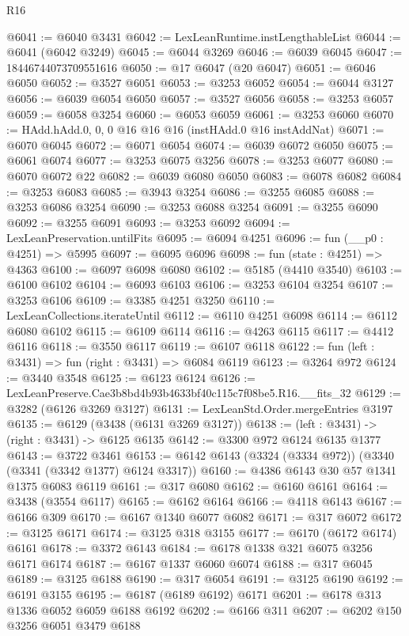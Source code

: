 \begin{lexlean}{R16}
\begin{coremodule}
@6041 := @6040 @3431
@6042 := LexLeanRuntime.instLengthableList
@6044 := @6041 (@6042 @3249)
@6045 := @6044 @3269
@6046 := @6039 @6045
@6047 := 18446744073709551616
@6050 := @17 @6047 (@20 @6047)
@6051 := @6046 @6050
@6052 := @3527 @6051
@6053 := @3253 @6052
@6054 := @6044 @3127
@6056 := @6039 @6054 @6050
@6057 := @3527 @6056
@6058 := @3253 @6057
@6059 := @6058 @3254
@6060 := @6053 @6059
@6061 := @3253 @6060
@6070 := HAdd.hAdd.{0, 0, 0} @16 @16 @16 (instHAdd.{0} @16 instAddNat)
@6071 := @6070 @6045
@6072 := @6071 @6054
@6074 := @6039 @6072 @6050
@6075 := @6061 @6074
@6077 := @3253 @6075 @3256
@6078 := @3253 @6077
@6080 := @6070 @6072 @22
@6082 := @6039 @6080 @6050
@6083 := @6078 @6082
@6084 := @3253 @6083
@6085 := @3943 @3254
@6086 := @3255 @6085
@6088 := @3253 @6086 @3254
@6090 := @3253 @6088 @3254
@6091 := @3255 @6090
@6092 := @3255 @6091
@6093 := @3253 @6092
@6094 := LexLeanPreservation.untilFits
@6095 := @6094 @4251
@6096 := fun (__p0 : @4251) => @5995
@6097 := @6095 @6096
@6098 := fun (state : @4251) => @4363
@6100 := @6097 @6098 @6080
@6102 := @5185 (@4410 @3540)
@6103 := @6100 @6102
@6104 := @6093 @6103
@6106 := @3253 @6104 @3254
@6107 := @3253 @6106
@6109 := @3385 @4251 @3250
@6110 := LexLeanCollections.iterateUntil
@6112 := @6110 @4251 @6098
@6114 := @6112 @6080 @6102
@6115 := @6109 @6114
@6116 := @4263 @6115
@6117 := @4412 @6116
@6118 := @3550 @6117
@6119 := @6107 @6118
@6122 := fun (left : @3431) => fun (right : @3431) => @6084 @6119
@6123 := @3264 @972
@6124 := @3440 @3548
@6125 := @6123 @6124
@6126 := LexLeanPreserve.Cae3b8bd4b93b4633bf40c115c7f08be5.R16.__fits_32
@6129 := @3282 (@6126 @3269 @3127)
@6131 := LexLeanStd.Order.mergeEntries @3197
@6135 := @6129 (@3438 (@6131 @3269 @3127))
@6138 := (left : @3431) -> (right : @3431) -> @6125 @6135
@6142 := @3300 @972 @6124 @6135 @1377
@6143 := @3722 @3461
@6153 := @6142 @6143 (@3324 (@3334 @972)) (@3340 (@3341 (@3342 @1377) @6124 @3317))
@6160 := @4386 @6143 @30 @57 @1341 @1375 @6083 @6119
@6161 := @317 @6080
@6162 := @6160 @6161
@6164 := @3438 (@3554 @6117)
@6165 := @6162 @6164
@6166 := @4118 @6143
@6167 := @6166 @309
@6170 := @6167 @1340 @6077 @6082
@6171 := @317 @6072
@6172 := @3125 @6171
@6174 := @3125 @318 @3155
@6177 := @6170 (@6172 @6174) @6161
@6178 := @3372 @6143
@6184 := @6178 @1338 @321 @6075 @3256 @6171 @6174
@6187 := @6167 @1337 @6060 @6074
@6188 := @317 @6045
@6189 := @3125 @6188
@6190 := @317 @6054
@6191 := @3125 @6190
@6192 := @6191 @3155
@6195 := @6187 (@6189 @6192) @6171
@6201 := @6178 @313 @1336 @6052 @6059 @6188 @6192
@6202 := @6166 @311
@6207 := @6202 @150 @3256 @6051 @3479 @6188

\end{coremodule}
\end{lexlean}
